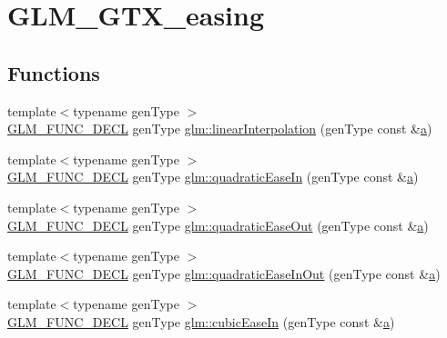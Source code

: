 \hypertarget{group__gtx__easing}{}\section{G\+L\+M\+\_\+\+G\+T\+X\+\_\+easing}
\label{group__gtx__easing}
\subsection*{Functions}
\begin{DoxyCompactItemize}
\item 
{\footnotesize template$<$typename gen\+Type $>$ }\\\hyperlink{setup_8hpp_ab2d052de21a70539923e9bcbf6e83a51}{G\+L\+M\+\_\+\+F\+U\+N\+C\+\_\+\+D\+E\+CL} gen\+Type \hyperlink{group__gtx__easing_ga290c3e47cb0a49f2e8abe90b1872b649}{glm\+::linear\+Interpolation} (gen\+Type const \&\hyperlink{_s_d_l__opengl__glext_8h_a3309789fc188587d666cda5ece79cf82}{a})
\item 
{\footnotesize template$<$typename gen\+Type $>$ }\\\hyperlink{setup_8hpp_ab2d052de21a70539923e9bcbf6e83a51}{G\+L\+M\+\_\+\+F\+U\+N\+C\+\_\+\+D\+E\+CL} gen\+Type \hyperlink{group__gtx__easing_gaf42089d35855695132d217cd902304a0}{glm\+::quadratic\+Ease\+In} (gen\+Type const \&\hyperlink{_s_d_l__opengl__glext_8h_a3309789fc188587d666cda5ece79cf82}{a})
\item 
{\footnotesize template$<$typename gen\+Type $>$ }\\\hyperlink{setup_8hpp_ab2d052de21a70539923e9bcbf6e83a51}{G\+L\+M\+\_\+\+F\+U\+N\+C\+\_\+\+D\+E\+CL} gen\+Type \hyperlink{group__gtx__easing_ga283717bc2d937547ad34ec0472234ee3}{glm\+::quadratic\+Ease\+Out} (gen\+Type const \&\hyperlink{_s_d_l__opengl__glext_8h_a3309789fc188587d666cda5ece79cf82}{a})
\item 
{\footnotesize template$<$typename gen\+Type $>$ }\\\hyperlink{setup_8hpp_ab2d052de21a70539923e9bcbf6e83a51}{G\+L\+M\+\_\+\+F\+U\+N\+C\+\_\+\+D\+E\+CL} gen\+Type \hyperlink{group__gtx__easing_ga03e8fc2d7945a4e63ee33b2159c14cea}{glm\+::quadratic\+Ease\+In\+Out} (gen\+Type const \&\hyperlink{_s_d_l__opengl__glext_8h_a3309789fc188587d666cda5ece79cf82}{a})
\item 
{\footnotesize template$<$typename gen\+Type $>$ }\\\hyperlink{setup_8hpp_ab2d052de21a70539923e9bcbf6e83a51}{G\+L\+M\+\_\+\+F\+U\+N\+C\+\_\+\+D\+E\+CL} gen\+Type \hyperlink{group__gtx__easing_gaff52f746102b94864d105563ba8895ae}{glm\+::cubic\+Ease\+In} (gen\+Type const \&\hyperlink{_s_d_l__opengl__glext_8h_a3309789fc188587d666cda5ece79cf82}{a})

\end{DoxyCompactItemize}
